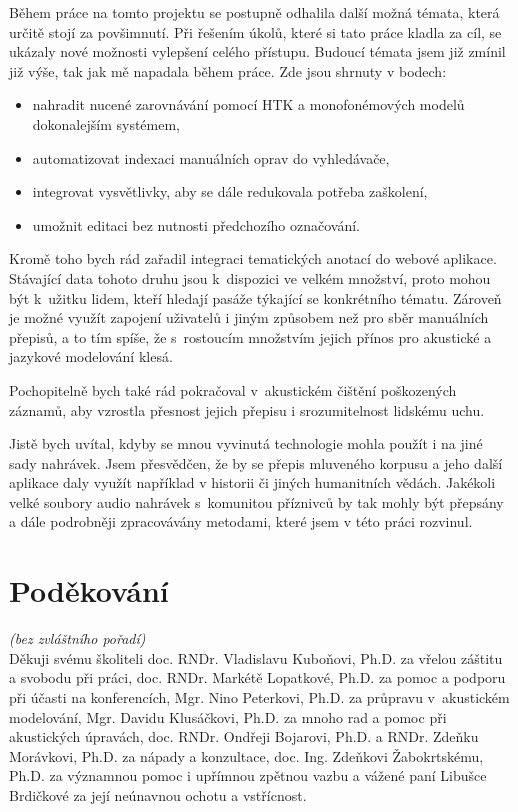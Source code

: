 Během práce na tomto projektu se postupně odhalila další možná témata, která určitě stojí za povšimnutí.
Při řešením úkolů, které si tato práce kladla za cíl, se ukázaly nové možnosti
vylepšení celého přístupu. Budoucí témata jsem již zmínil již výše, tak jak mě
napadala během práce. Zde jsou shrnuty v bodech:

\begin{itemize}
\item{nahradit nucené zarovnávání pomocí HTK a monofonémových modelů
dokonalejším systémem,}
\item{automatizovat indexaci manuálních oprav do vyhledávače,}
\item{integrovat vysvětlivky, aby se dále redukovala potřeba zaškolení,}
\item{umožnit editaci bez nutnosti předchozího označování.}
\end{itemize}

Kromě toho bych rád zařadil integraci tematických anotací do webové aplikace.
Stávající data tohoto druhu jsou k~dispozici ve velkém množství, proto mohou být
k~užitku lidem, kteří hledají pasáže týkající se konkrétního tématu. Zároveň je
možné využít zapojení uživatelů i jiným způsobem než pro sběr manuálních
přepisů, a to tím spíše, že s~rostoucím množstvím jejich přínos pro akustické a
jazykové modelování klesá.


Pochopitelně bych také rád pokračoval v~akustickém čištění poškozených záznamů,
aby vzrostla přesnost jejich přepisu i srozumitelnost lidskému uchu.

Jistě bych uvítal, kdyby se mnou vyvinutá technologie mohla použít i na jiné
sady nahrávek. Jsem přesvědčen, že by se přepis mluveného korpusu a jeho další
aplikace daly využít například v historii či jiných humanitních vědách. Jakékoli
velké soubory audio nahrávek s~komunitou příznivců by tak mohly být přepsány a
dále podrobněji zpracovávány metodami, které jsem v této práci rozvinul.


\section{Poděkování}

{\em (bez zvláštního pořadí)}\\

Děkuji
svému školiteli doc. RNDr. Vladislavu Kuboňovi, Ph.D. za vřelou záštitu a svobodu při práci,
doc. RNDr. Markétě Lopatkové, Ph.D. za pomoc a podporu při účasti na konferencích,
Mgr. Nino Peterkovi, Ph.D. za průpravu v~akustickém modelování, 
Mgr. Davidu Klusáčkovi, Ph.D. za mnoho rad a pomoc při akustických úpravách,
doc. RNDr. Ondřeji Bojarovi, Ph.D.
a RNDr. Zdeňku Morávkovi, Ph.D. za nápady a konzultace,
doc. Ing. Zdeňkovi Žabokrtskému, Ph.D. za významnou pomoc i upřímnou zpětnou vazbu
a vážené paní Libušce Brdičkové za její neúnavnou ochotu a vstřícnost.

